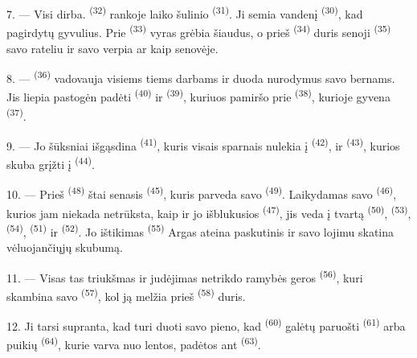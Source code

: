 7. --- Visi dirba.  \textsuperscript{(32)} rankoje laiko šulinio
 \textsuperscript{(31)}. Ji semia vandenį 
\textsuperscript{(30)}, kad pagirdytų gyvulius. Prie 
\textsuperscript{(33)} vyras grėbia šiaudus, o prieš 
\textsuperscript{(34)} duris senoji  \textsuperscript{(35)} savo
rateliu ir savo  verpia  ar  kaip
senovėje.

\VUsaut{3.0mm}
\VUsaut{3.0mm}

8. ---  \textsuperscript{(36)} vadovauja visiems tiems darbams ir
duoda nurodymus savo bernams. Jis liepia pastogėn padėti 
\textsuperscript{(40)} ir  \textsuperscript{(39)}, kuriuos pamiršo prie
 \textsuperscript{(38)}, kurioje gyvena 
\textsuperscript{(37)}.

9. --- Jo šūksniai išgąsdina  \textsuperscript{(41)}, kuris visais
sparnais nulekia į  \textsuperscript{(42)}, ir 
\textsuperscript{(43)}, kurios skuba grįžti į  \textsuperscript{(44)}.

10. --- Prieš  \textsuperscript{(48)} štai senasis 
\textsuperscript{(45)}, kuris parveda savo  \textsuperscript{(49)}.
Laikydamas savo  \textsuperscript{(46)}, kurios jam niekada netrūksta,
kaip ir jo išblukusios  \textsuperscript{(47)}, jis veda į tvartą
 \textsuperscript{(50)},  \textsuperscript{(53)},
 \textsuperscript{(54)},  \textsuperscript{(51)} ir
 \textsuperscript{(52)}. Jo ištikimas 
\textsuperscript{(55)} Argas ateina paskutinis ir savo lojimu skatina vėluojančiųjų
skubumą.

11. --- Visas tas triukšmas ir judėjimas netrikdo ramybės geros  \textsuperscript{(56)}, kuri skambina savo 
\textsuperscript{(57)}, kol ją melžia prieš  \textsuperscript{(58)}
duris.

12. Ji tarsi supranta, kad turi duoti savo pieno, kad 
\textsuperscript{(60)} galėtų paruošti  
\textsuperscript{(61)} arba puikių  \textsuperscript{(64)}, kurie varva
nuo lentos, padėtos ant  \textsuperscript{(63)}.


